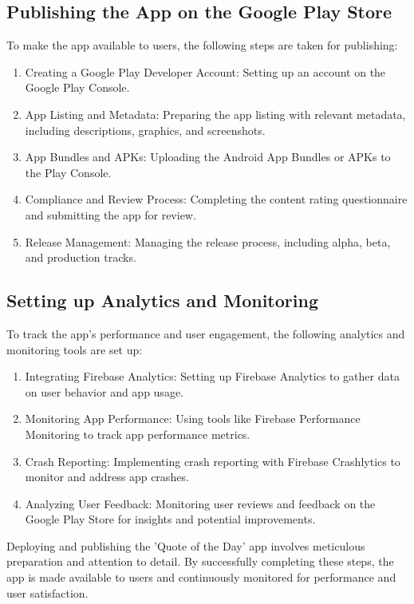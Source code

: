 \documentclass{book}
\begin{document}
\subsection{Publishing the App on the Google Play Store}
To make the app available to users, the following steps are taken for publishing:
\begin{enumerate}
    \item Creating a Google Play Developer Account: Setting up an account on the Google Play Console.
    \item App Listing and Metadata: Preparing the app listing with relevant metadata, including descriptions, graphics, and screenshots.
    \item App Bundles and APKs: Uploading the Android App Bundles or APKs to the Play Console.
    \item Compliance and Review Process: Completing the content rating questionnaire and submitting the app for review.
    \item Release Management: Managing the release process, including alpha, beta, and production tracks.
\end{enumerate}

\subsection{Setting up Analytics and Monitoring}
To track the app's performance and user engagement, the following analytics and monitoring tools are set up:
\begin{enumerate}
    \item Integrating Firebase Analytics: Setting up Firebase Analytics to gather data on user behavior and app usage.
    \item Monitoring App Performance: Using tools like Firebase Performance Monitoring to track app performance metrics.
    \item Crash Reporting: Implementing crash reporting with Firebase Crashlytics to monitor and address app crashes.
    \item Analyzing User Feedback: Monitoring user reviews and feedback on the Google Play Store for insights and potential improvements.
\end{enumerate}

Deploying and publishing the 'Quote of the Day' app involves meticulous preparation and attention to detail. By successfully completing these steps, the app is made available to users and continuously monitored for performance and user satisfaction.
\end{document}
